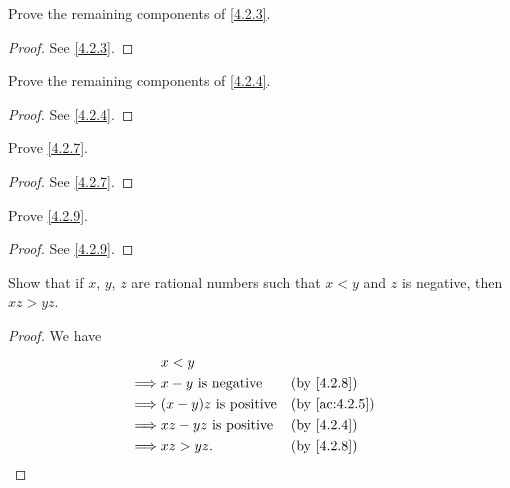\begin{ex}\label{ex:4.2.2}
  Prove the remaining components of \cref{4.2.3}.
\end{ex}

\begin{proof}
  See \cref{4.2.3}.
\end{proof}

\begin{ex}\label{ex:4.2.3}
  Prove the remaining components of \cref{4.2.4}.
\end{ex}

\begin{proof}
  See \cref{4.2.4}.
\end{proof}

\begin{ex}\label{ex:4.2.4}
  Prove \cref{4.2.7}.
\end{ex}

\begin{proof}
  See \cref{4.2.7}.
\end{proof}

\begin{ex}\label{ex:4.2.5}
  Prove \cref{4.2.9}.
\end{ex}

\begin{proof}
  See \cref{4.2.9}.
\end{proof}

\begin{ex}\label{ex:4.2.6}
  Show that if \(x\), \(y\), \(z\) are rational numbers such that \(x < y\) and \(z\) is negative, then \(xz > yz\).
\end{ex}

\begin{proof}
  We have
  \begin{align*}
             & x < y                                                         \\
    \implies & x - y \text{ is negative}    &  & \by{4.2.8}                  \\
    \implies & (x - y)z \text{ is positive} &  & \text{(by \cref{ac:4.2.5})} \\
    \implies & xz - yz \text{ is positive}  &  & \by{4.2.4}                  \\
    \implies & xz > yz.                     &  & \by{4.2.8}
  \end{align*}
\end{proof}